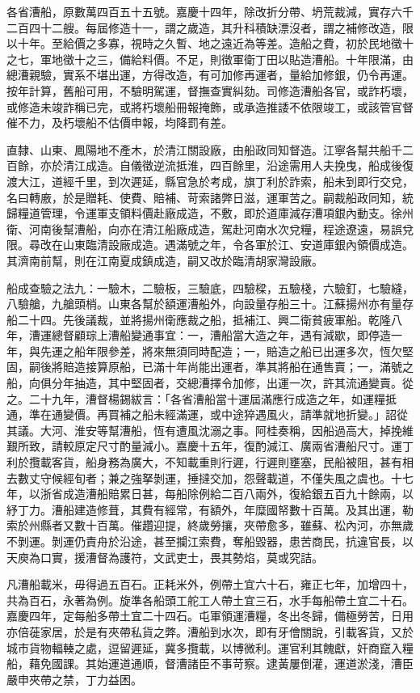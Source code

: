 \begin{pinyinscope}
各省漕船，原數萬四百五十五號。嘉慶十四年，除改折分帶、坍荒裁減，實存六千二百四十二艘。每屆修造十一，謂之歲造，其升科積缺漂沒者，謂之補修改造，限以十年。至給價之多寡，視時之久暫、地之遠近為等差。造船之費，初於民地徵十之七，軍地徵十之三，備給料價。不足，則徵軍衛丁田以貼造漕船。十年限滿，由總漕親驗，實系不堪出運，方得改造，有可加修再運者，量給加修銀，仍令再運。按年計算，舊船可用，不驗明駕運，督撫查實糾劾。司修造漕船各官，或詐朽壞，或修造未竣詐稱已完，或將朽壞船冊報掩飾，或承造推諉不依限竣工，或該管官督催不力，及朽壞船不估價申報，均降罰有差。

直隸、山東、鳳陽地不產木，於清江關設廠，由船政同知督造。江寧各幫共船千二百餘，亦於清江成造。自儀徵逆流抵淮，四百餘里，沿途需用人夫挽曳，船成後復渡大江，道經千里，到次遲延，縣官急於考成，旗丁利於詐索，船未到即行交兌，名曰轉廒，於是贈耗、使費、賠補、苛索諸弊日滋，運軍苦之。嗣裁船政同知，統歸糧道管理，令運軍支領料價赴廠成造，不敷，即於道庫減存漕項銀內動支。徐州衛、河南後幫漕船，向亦在清江船廠成造，駕赴河南水次兌糧，程途遼遠，易誤兌限。尋改在山東臨清設廠成造。遇滿號之年，令各軍於江、安道庫銀內領價成造。其濟南前幫，則在江南夏成鎮成造，嗣又改於臨清胡家灣設廠。

船成查驗之法九：一驗木，二驗板，三驗底，四驗樑，五驗棧，六驗釘，七驗縫，八驗艙，九艙頭梢。山東各幫於額運漕船外，向設量存船三十。江蘇揚州亦有量存船二十四。先後議裁，並將揚州衛應裁之船，抵補江、興二衛貧疲軍船。乾隆八年，漕運總督顧琮上漕船變通事宜：一，漕船當大造之年，遇有減歇，即停造一年，與先運之船年限參差，將來無須同時配造；一，賠造之船已出運多次，恆欠堅固，嗣後將賠造接算原船，已滿十年尚能出運者，準其將船在通售賣；一，滿號之船，向俱分年抽造，其中堅固者，交總漕擇令加修，出運一次，許其流通變賣。從之。二十九年，漕督楊錫紱言：「各省漕船當十運屆滿應行成造之年，如運糧抵通，準在通變價。再買補之船未經滿運，或中途猝遇風火，請準就地折變。」詔從其議。大河、淮安等幫漕船，恆有遭風沈溺之事。阿桂奏稱，因船過高大，掉挽維艱所致，請較原定尺寸酌量減小。嘉慶十五年，復酌減江、廣兩省漕船尺寸。運丁利於攬載客貨，船身務為廣大，不知載重則行遲，行遲則壅塞，民船被阻，甚有相去數丈守候經旬者；兼之強拏剝運，捶撻交加，怨聲載道，不僅失風之虞也。十七年，以浙省成造漕船賠累日甚，每船除例給二百八兩外，復給銀五百九十餘兩，以紓丁力。漕船建造修葺，其費有經常，有額外，年糜國帑數十百萬。及其出運，勒索於州縣者又數十百萬。催趲迎提，終歲勞攘，夾帶愈多，雖蘇、松內河，亦無歲不剝運。剝運仍責舟於沿途，甚至攔江索費，奪船毀器，患苦商民，抗違官長，以天庾為口實，援漕督為護符，文武吏士，畏其勢焰，莫或究詰。

凡漕船載米，毋得過五百石。正耗米外，例帶土宜六十石，雍正七年，加增四十，共為百石，永著為例。旋準各船頭工舵工人帶土宜三石，水手每船帶土宜二十石。嘉慶四年，定每船多帶土宜二十四石。屯軍領運漕糧，冬出冬歸，備極勞苦，日用亦倍蓰家居，於是有夾帶私貨之弊。漕船到水次，即有牙儈關說，引載客貨，又於城市貨物輻輳之處，逗留遲延，冀多攬載，以博微利。運官利其餽獻，奸商竄入糧船，藉免國課。其始運道通順，督漕諸臣不事苛察。逮黃屢倒灌，運道淤淺，漕臣嚴申夾帶之禁，丁力益困。


\end{pinyinscope}
